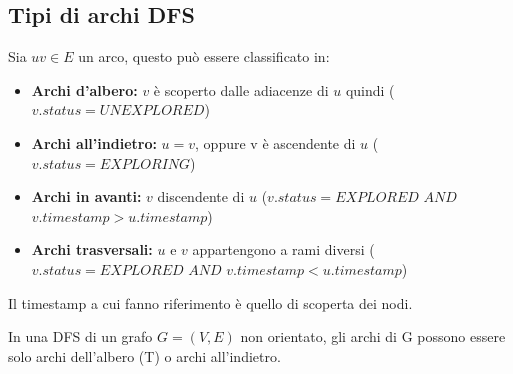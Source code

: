 \subsection{Tipi di archi DFS}
Sia $uv \in E$ un arco, questo può essere classificato in:
\begin{itemize}
    \item \textbf{Archi d'albero:} $v$ è scoperto dalle adiacenze di $u$ quindi ($v.status = UNEXPLORED$)
    \item \textbf{Archi all'indietro:} $u=v$, oppure v è ascendente di $u$ ($v.status = EXPLORING $)
    \item \textbf{Archi in avanti:} $v$ discendente di $u$ ($v.status=EXPLORED$ $AND$ $v.timestamp > u.timestamp$)
    \item \textbf{Archi trasversali:} $u$ e $v$ appartengono a rami diversi ($v.status=EXPLORED$ $AND$ $v.timestamp < u.timestamp$) 
\end{itemize}
\noindent Il timestamp a cui fanno riferimento è quello di scoperta dei nodi.\medskip\\
\colorbox{SALZO}{\parbox{\dimexpr\linewidth-2\fboxsep}{\begin{theorem}
   In una DFS di un grafo $G=(V,E)$ non orientato, gli archi di G possono essere solo archi dell'albero (T) o archi all'indietro.
\end{theorem}}}
